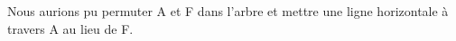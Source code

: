 \begin{Exercice}[10 minutes]
\begin{solution}
Nous aurions pu permuter A et F dans l'arbre et mettre une ligne horizontale à travers A au lieu de F. 
\end{solution}






\end{Exercice}
